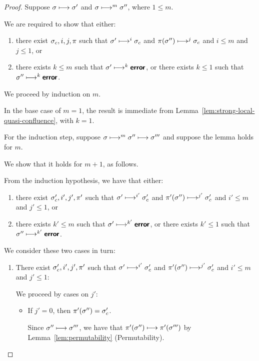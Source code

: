 \begin{proof}
  Suppose $\sigma \longmapsto \sigma'$ and $\sigma \longmapsto^m
  \sigma''$, where $1 \leq m$.

  We are required to show that either:
  \begin{enumerate}
  \item there exist $\sigma_c, i, j, \pi$ such that $\sigma'
    \longmapsto^i \sigma_c$ and $\pi(\sigma'') \longmapsto^j \sigma_c$
    and $i \leq m$ and $j \leq 1$, or
  \item there exists $k \leq m$ such that $\sigma' \longmapsto^k
    \textup{\ensuremath{\textbf{\textsf{error}}}}$, or there exists $k \leq 1$ such that $\sigma''
    \longmapsto^k \textup{\ensuremath{\textbf{\textsf{error}}}}$.
  \end{enumerate}

  We proceed by induction on $m$.

  In the base case of $m = 1$, the result is immediate from
  Lemma~\ref{lem:strong-local-quasi-confluence}, with $k = 1$.

  For the induction step, suppose $\sigma \longmapsto^m \sigma''
  \longmapsto \sigma'''$ and suppose the lemma holds for $m$.

  We show that it holds for $m + 1$, as follows.

  From the induction hypothesis, we have that either:
  \begin{enumerate}
  \item there exist $\sigma_c', i', j', \pi'$ such that $\sigma'
    \longmapsto^{i'} \sigma_c'$ and $\pi'(\sigma'') \longmapsto^{j'}
    \sigma_c'$ and $i' \leq m$ and $j' \leq 1$, or
  \item there exists $k' \leq m$ such that $\sigma'
    \longmapsto^{k'} \textbf{\textsf{error}}$, or there exists $k' \leq 1$ such that
    $\sigma'' \longmapsto^{k'} \textbf{\textsf{error}}$.
  \end{enumerate}

  We consider these two cases in turn:
  \begin{enumerate}
  \item There exist $\sigma_c', i', j', \pi'$ such that $\sigma'
    \longmapsto^{i'} \sigma_c'$ and $\pi'(\sigma'') \longmapsto^{j'}
    \sigma_c'$ and $i' \leq m$ and $j' \leq 1$:

    We proceed by cases on $j'$:
    \begin{itemize}

    \item If $j' = 0$, then $\pi'(\sigma'') = \sigma_c'$.

      Since $\sigma'' \longmapsto \sigma'''$, we have that
      $\pi'(\sigma'') \longmapsto \pi'(\sigma''')$ by
      Lemma~\ref{lem:permutability} (Permutability).


\end{itemize}
\end{enumerate}
\end{proof}
